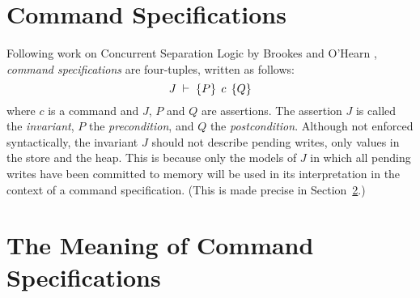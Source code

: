 \documentclass[11pt]{report}
\begin{document}
\section{Command Specifications} %
\label{sec:command_specifications}

Following work on Concurrent Separation Logic by Brookes \cite{DBLP:journals/tcs/Brookes07} and O'Hearn \cite{DBLP:journals/tcs/OHearn07}, \emph{command specifications} are four-tuples, written as follows: \[ J\;\vdash\;\left\lbrace P \right\rbrace\;c\;\left\lbrace Q \right\rbrace\] where $c$ is a command and $J$, $P$ and $Q$ are assertions. The assertion $J$ is called the \emph{invariant}, $P$ the \emph{precondition}, and $Q$ the \emph{postcondition}. Although not enforced syntactically, the invariant $J$ should not describe pending writes, only values in the store and the heap. This is because only the models of $J$ in which all pending writes have been committed to memory will be used in its interpretation in the context of a command specification. (This is made precise in Section~\ref{sec:the_meaning_of_command_specifications}.)


\section{The Meaning of Command Specifications} %
\label{sec:the_meaning_of_command_specifications}
% 
\end{document}
